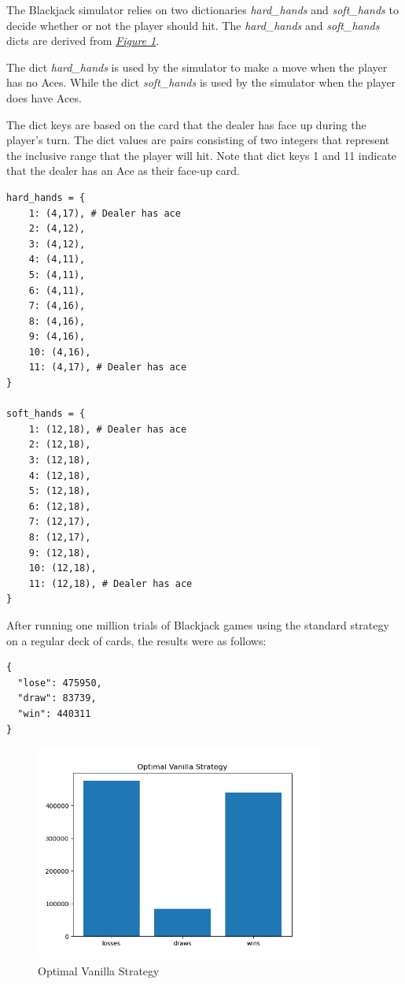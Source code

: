\documentclass{article}
\begin{document}
{		The Blackjack simulator relies on two dictionaries \textit{hard\_hands} and \textit{soft\_hands} to decide whether or not the player should hit.
		The \textit{hard\_hands} and \textit{soft\_hands} dicts are derived from \hyperlink{fig1}{\textit{Figure 1}}.

		The dict \textit{hard\_hands} is used by the simulator to make a move when the player has no Aces. While the dict
		\textit{soft\_hands} is used by the simulator when the player does have Aces.

		The dict keys are based on the card that the dealer has face up during the player's turn.
		The dict values are pairs consisting of two integers that represent the inclusive range that the player will hit. 
		Note that dict keys 1 and 11 indicate that the dealer has an Ace as their face-up card.

    \begin{verbatim}
hard_hands = {
	1: (4,17), # Dealer has ace
	2: (4,12),
	3: (4,12),
	4: (4,11),
	5: (4,11),
	6: (4,11),
	7: (4,16),
	8: (4,16),
	9: (4,16),
	10: (4,16),
	11: (4,17), # Dealer has ace
}

soft_hands = {
	1: (12,18), # Dealer has ace
	2: (12,18), 
	3: (12,18), 
	4: (12,18), 
	5: (12,18), 
	6: (12,18), 
	7: (12,17), 
	8: (12,17), 
	9: (12,18), 
	10: (12,18), 
	11: (12,18), # Dealer has ace
}
        \end{verbatim}

        After running one million trials of Blackjack games using the standard strategy on a regular deck of cards, the results 
		were as follows:

		\begin{verbatim}
{
  "lose": 475950,
  "draw": 83739,
  "win": 440311
}
        \end{verbatim}
        
		\begin{figure}[H]
			\hypertarget{fig2}{}
			\begin{center}
				\includegraphics[width=9.5cm]{optimal-vanilla.png}
			\end{center}
			\vspace{-10mm}
			\caption{Optimal Vanilla Strategy}
		\end{figure}

}
\end{document}
